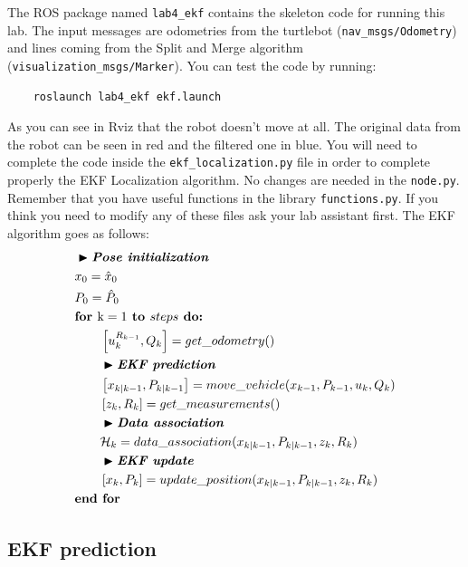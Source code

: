 \documentclass[a4paper,10pt]{article}
\begin{document}
The ROS package named \texttt{lab4\_ekf} contains the skeleton code for running this lab. The input messages are odometries from the turtlebot (\texttt{nav\_msgs/Odometry}) and lines coming from the Split and Merge algorithm (\texttt{visualization\_msgs/Marker}). You can test the code by running:
\begin{verbatim}
    roslaunch lab4_ekf ekf.launch
\end{verbatim}
\noindent
As you can see in Rviz that the robot doesn't move at all. The original data from the robot can be seen in red and the filtered one in blue. You will need to complete the code inside the \texttt{ekf\_localization.py} file in order to complete properly the EKF Localization algorithm. No changes are needed in the \texttt{node.py}. Remember that you have useful functions in the library \texttt{functions.py}. If you think you need to modify any of these files ask your lab assistant first. The EKF algorithm goes as follows:
\begin{align*} \scriptsize
    & \blacktriangleright \textit{\textbf{Pose initialization}}\\
    & x_0 = \hat{x}_0 \\
    & P_0 = \hat{P}_0 \\
    & \textbf{for } \text{k} = 1 \textbf{ to } steps \textbf{ do:} \\
    & \qquad \left[ u_k^{R_{k-1}}, Q_k \right] = get\_odometry() \\
    & \qquad \blacktriangleright \textit{\textbf{EKF prediction}}\\
    & \qquad \left[ x_{k|k-1}, P_{k|k-1} \right] = move\_vehicle(x_{k-1}, P_{k-1}, u_k, Q_k) \\
    & \qquad \left[ z_k, R_k \right] = get\_measurements() \\
    & \qquad \blacktriangleright \textit{\textbf{Data association}}\\
    & \qquad \mathcal{H}_k = data\_association(x_{k|k-1}, P_{k|k-1}, z_k, R_k) \\
    & \qquad \blacktriangleright \textit{\textbf{EKF update}}\\
    & \qquad \left[ x_k, P_k \right] = update\_position(x_{k|k-1}, P_{k|k-1}, z_k, R_k) \\
    & \textbf{end for}
\end{align*}

\subsection{EKF prediction}
\end{document}
